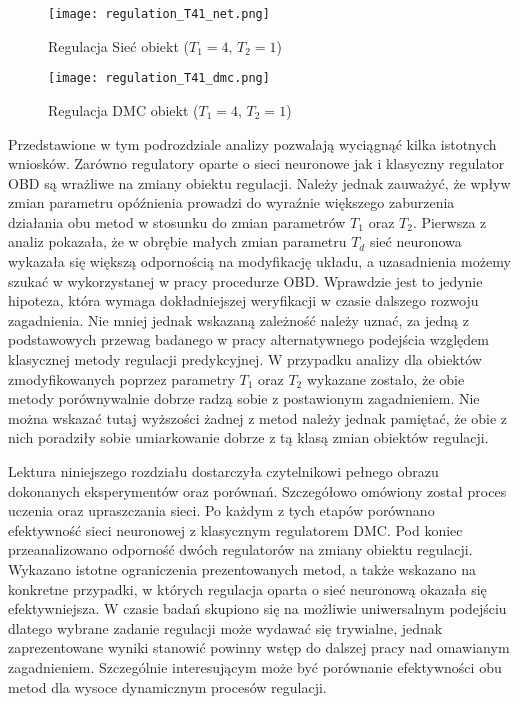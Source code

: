 \begin{figure}[!h]
\centering
\begin{minipage}{.5\textwidth}
  \label{fig:Regulation-T41-net}
  \centering \texttt{[image: regulation\_T41\_net.png]}
  \caption{Regulacja Sieć obiekt (\( T_1=4, \, T_2=1 \))}
  \label{fig:test1}
\end{minipage}%
\begin{minipage}{.5\textwidth}
  \label{fig:Regulation-T41-dmc}
  \centering \texttt{[image: regulation\_T41\_dmc.png]}
  \caption{Regulacja DMC obiekt (\( T_1=4, \, T_2=1 \))}
\end{minipage}
\end{figure}

\par Przedstawione w tym podrozdziale analizy pozwalają wyciągnąć kilka istotnych wniosków. Zarówno regulatory oparte o sieci neuronowe jak i klasyczny regulator OBD są wrażliwe na zmiany obiektu regulacji. Należy jednak zauważyć, że wpływ zmian parametru opóźnienia prowadzi do wyraźnie większego zaburzenia działania obu metod w stosunku do zmian parametrów \(T_1 \) oraz \(T_2\). Pierwsza z analiz pokazała, że w obrębie małych zmian parametru \(T_d\) sieć neuronowa wykazała się większą odpornością na modyfikację układu, a uzasadnienia możemy szukać w wykorzystanej w pracy procedurze OBD. Wprawdzie jest to jedynie hipoteza, która wymaga dokładniejszej weryfikacji w czasie dalszego rozwoju zagadnienia. Nie mniej jednak wskazaną zależność należy uznać, za jedną z podstawowych przewag badanego w pracy alternatywnego podejścia względem klasycznej metody regulacji predykcyjnej. W przypadku analizy dla obiektów zmodyfikowanych poprzez parametry \(T_1 \) oraz \(T_2\) wykazane zostało, że obie metody porównywalnie dobrze radzą sobie z postawionym zagadnieniem. Nie można wskazać tutaj wyższości żadnej z metod należy jednak pamiętać, że obie z nich poradziły sobie umiarkowanie dobrze z tą klasą zmian obiektów regulacji.

\vspace{10mm}

\par Lektura niniejszego rozdziału dostarczyła czytelnikowi pełnego obrazu dokonanych eksperymentów oraz porównań. Szczegółowo omówiony został proces uczenia oraz upraszczania sieci. Po każdym z tych etapów porównano efektywność sieci neuronowej z klasycznym regulatorem DMC. Pod koniec przeanalizowano odporność dwóch regulatorów na zmiany obiektu regulacji. Wykazano istotne ograniczenia prezentowanych metod, a także wskazano na konkretne przypadki, w których regulacja oparta o sieć neuronową okazała się efektywniejsza. W czasie badań skupiono się na możliwie uniwersalnym podejściu dlatego wybrane zadanie regulacji może wydawać się trywialne, jednak zaprezentowane wyniki stanowić powinny wstęp do dalszej pracy nad omawianym zagadnieniem. Szczególnie interesującym może być porównanie efektywności obu metod dla wysoce dynamicznym procesów regulacji.  
